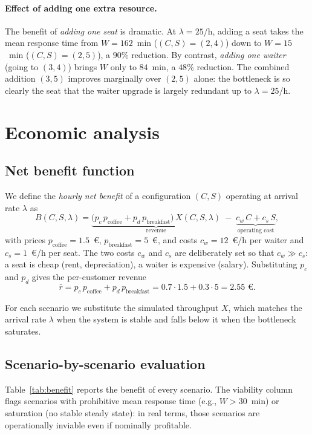 \documentclass[11pt,a4paper]{article}
\begin{document}
\paragraph{Effect of adding one extra resource.}
The benefit of \emph{adding one seat} is dramatic. At $\lambda = 25$/h,
adding a seat takes the mean response time from $W = 162$~min
($(C,S)=(2,4)$) down to $W = 15$~min ($(C,S)=(2,5)$), a $90\%$
reduction. By contrast, \emph{adding one waiter} (going to $(3,4)$)
brings $W$ only to $84$~min, a $48\%$ reduction. The combined
addition $(3,5)$ improves marginally over $(2,5)$ alone:
the bottleneck is so clearly the seat that the waiter upgrade is
largely redundant up to $\lambda = 25$/h.

\section{Economic analysis}

\subsection{Net benefit function}
We define the \emph{hourly net benefit} of a configuration $(C,S)$
operating at arrival rate $\lambda$ as
\begin{equation}
B(C,S,\lambda)
 = \underbrace{\big(p_c\,p_{\text{coffee}} + p_d\,p_{\text{breakfast}}\big)\,X(C,S,\lambda)}_{\text{revenue}}
 \;-\; \underbrace{c_w\,C + c_s\,S}_{\text{operating cost}},
\label{eq:benefit}
\end{equation}
with prices $p_{\text{coffee}} = 1.5$~€, $p_{\text{breakfast}} = 5$~€,
and costs $c_w = 12$~€/h per waiter and $c_s = 1$~€/h per seat.
The two costs $c_w$ and $c_s$ are deliberately set so that
$c_w \gg c_s$: a seat is cheap (rent, depreciation), a waiter is
expensive (salary). Substituting $p_c$ and $p_d$ gives the
per-customer revenue
\[
\bar r = p_c\,p_{\text{coffee}} + p_d\,p_{\text{breakfast}}
       = 0.7\cdot 1.5 + 0.3\cdot 5 = 2.55 \text{ €}.
\]

For each scenario we substitute the simulated throughput $X$, which
matches the arrival rate $\lambda$ when the system is stable and falls
below it when the bottleneck saturates.

\subsection{Scenario-by-scenario evaluation}
Table~\ref{tab:benefit} reports the benefit of every scenario.
The viability column flags scenarios with prohibitive mean response
time (e.g., $W > 30$~min) or saturation (no stable steady state):
in real terms, those scenarios are operationally inviable even if
nominally profitable.
\end{document}
